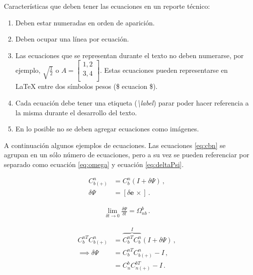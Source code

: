 \documentclass{article}
\begin{document}
Características que deben tener las ecuaciones en un reporte técnico:

\begin{enumerate}

    \item Deben estar numeradas en orden de aparición.

    \item Deben ocupar una línea por ecuación.

    \item Las ecuaciones que se representan durante el texto no deben numerarse, por ejemplo, $ \sqrt{\frac{1}{2}} $ o
    $ A = \begin{bmatrix} 1,2 \\ 3,4\\ \end{bmatrix} $. Estas ecuaciones pueden representarse en \LaTeX{} entre dos símbolos pesos (\$ ecuacion \$).

    \item Cada ecuación debe tener una etiqueta  (\emph{\textbackslash label}) parar poder hacer referencia a la misma durante el desarrollo del texto.

    \item En lo posible no se deben agregar ecuaciones como imágenes.

\end{enumerate}

A continuación algunos ejemplos de ecuaciones. Las ecuaciones \ref{eq:cbn} se agrupan en un sólo número de ecuaciones, pero a su vez se pueden referenciar por separado como ecuación \ref{eq:omega} y ecuación \ref{eq:deltaPsi}.

\begin{subequations} \label{eq:cbn}
	\begin{align}
		\label{eq:omega}    C^n_{b(+)} &= C^n_{b} (I + {\delta \Psi})  \, , \\
		\label{eq:deltaPsi} \delta \Psi &= [ {\delta \boldsymbol e} \, \times ] \, .
	\end{align}
\end{subequations}

\begin{align} \label{eq:limite}
\lim_{ \delta t \to 0} {\frac {\delta \Psi }{\delta t }} = {\Omega_{nb}^b} \, .
\end{align}

\begin{subequations} \label{eq:inc_psi}
	\begin{align}
	 C_{b}^{nT} C_{b(+)}^n  &= \overbrace{ C_{b}^{nT} C_{b}^n}^{I} ( I + {\delta \Psi} )  \, , \\
	 \implies {\delta \Psi} &= C_{b}^{nT} C_{b(+)}^n - I  \, , \\
							&= C_{n}^b    C_{n(+)}^{bT} - I \, .
	\end{align}
\end{subequations}
\end{document}
